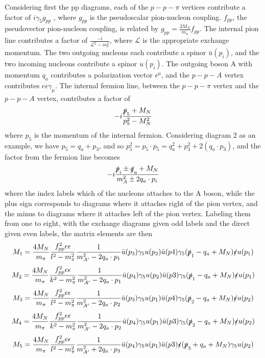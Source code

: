 \documentclass[10pt,a4paper]{article}
\begin{document}
Considering first the pp diagrams, each of the $p-p-\pi $ vertices contribute a factor of $ i\gamma_5 g_{pp}$ , where $g_{pp}$ is the pseudoscalar pion-nucleon coupling. $f_{pp}$, the pseudovector pion-nucleon coupling, is related by $ g_{pp} = \frac{2M_N}{m_\pi} f_{pp} $. The internal  pion line contributes a factor of $\frac{-i}{\mathcal{L}^2 - m_\pi^2}$, where $ \mathcal{L} $ is the appropriate exchange momentum.  The two outgoing nucleons each contribute a spinor $ \bar{u}(p_i)$, and the two incoming nucleons contribute a spinor $u(p_i)$. The outgoing boson A with momentum $q_a$ contributes a polarization vector $\epsilon^\mu$, and the $ p-p-A $ vertex contributes $e\epsilon \gamma_\mu$. The internal fermion line, between the $p-p-\pi$ vertex and the $p-p-A$ vertex, contributes a factor of \[ -i\frac{\slashed p_5 + M_N}{p_5^2-M^2_N} \] where $p_5$ is the momentum of the internal fermion. Considering diagram 2 as an example, we have $p_5 = q_a + p_3$, and so $p_5^2 = p_5 \cdot p_5 = q_a^2 + p_3^2 + 2 (q_a \cdot p_3)$, and the factor from the fermion line becomes \[ -i\frac{\slashed p_i \pm \slashed q_a + M_N}{m_A^2 \pm 2 q_a \cdot p_i} \] where the index labels which of the nucleons attaches to the A boson, while the plus sign corresponds to diagrams where it attaches right of the pion vertex, and the minus to diagrams where it attaches left of the pion vertex. Labeling them from one to eight, with the exchange diagrams given odd labels and the direct given even labels, the matrix elements are then
		 \[ M_1 = \frac{4 M_N}{ m_\pi} \frac{f_{pp}^2 e \epsilon}{l^2-m_\pi^2
	 	}  \frac{1}{m_{A^\prime}^2 - 2 q_a \cdot p_1} \bar{u}(p_3) \gamma_5 u(p_2) \bar{u}(p4) \gamma_5 (\slashed{p}_1 - q_a +M_N)\slashed{\epsilon} u(p_1)\]
%
	 	\[ M_2 = \frac{4 M_N}{ m_\pi} \frac{f_{pp}^2 e \epsilon}{k^2-m_\pi^2
	 	}  \frac{1}{m_{A^\prime}^2 - 2 q_a \cdot p_1} \bar{u}(p_4) \gamma_5 u(p_2) \bar{u}(p3) \gamma_5 (\slashed{p}_1 - q_a +M_N)\slashed \epsilon  u(p_1) \]
	 	\[ M_3 = \frac{4 M_N}{ m_\pi} \frac{f_{pp}^2 e \epsilon}{l^2-m_\pi^2
	 	}  \frac{1}{m_{A^\prime}^2 - 2 q_a \cdot p_2} \bar{u}(p_3) \gamma_5 u(p_1) \bar{u}(p4) \gamma_5 (\slashed{p}_2 - q_a +M_N)\slashed \epsilon  u(p_2) \]
%
	 	\[ M_4 = \frac{4 M_N}{ m_\pi} \frac{f_{pp}^2 e \epsilon}{k^2-m_\pi^2
	 	}  \frac{1}{m_{A^\prime}^2 - 2 q_a \cdot p_2} \bar{u}(p_4) \gamma_5 u(p_1) \bar{u}(p3) \gamma_5 (\slashed{p}_2 - q_a +M_N)\slashed \epsilon  u(p_2) \]
%	
		 \[ M_5 = \frac{4 M_N}{ m_\pi} \frac{f_{pp}^2 e \epsilon}{l^2-m_\pi^2
			 }  \frac{1}{m_{A^\prime}^2 + 2 q_a \cdot p_3} \bar{u}(p_4) \gamma_5 u(p_1) \bar{u}(p3) \slashed{\epsilon} (\slashed{p}_3 + q_a +M_N)\gamma_5 u(p_2)\]
\end{document}

